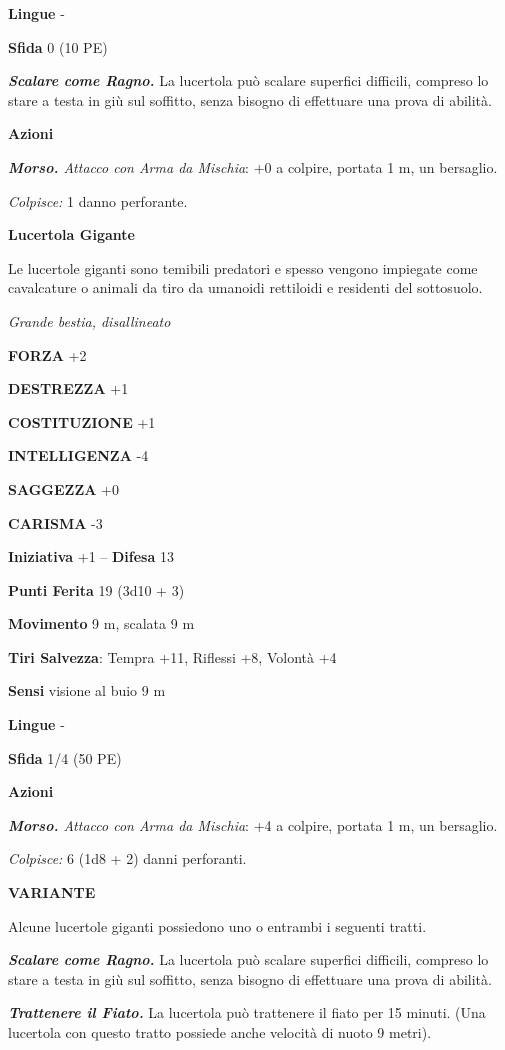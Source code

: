 \begin{multicols}{2}
\textbf{Lingue} -

\textbf{Sfida} 0 (10 PE)

\emph{\textbf{Scalare come Ragno.}} La lucertola può scalare superfici difficili, compreso lo stare a testa in giù sul soffitto, senza bisogno di effettuare una prova di abilità.

\textbf{Azioni}

\emph{\textbf{Morso.} Attacco con Arma da Mischia}: +0 a colpire, portata 1 m, un bersaglio.

\emph{Colpisce:} 1 danno perforante.

\medskip\textbf{Lucertola Gigante}

Le lucertole giganti sono temibili predatori e spesso vengono impiegate come cavalcature o animali da tiro da umanoidi rettiloidi e residenti del sottosuolo.

\emph{Grande bestia, disallineato}

\textbf{FORZA} +2

\textbf{DESTREZZA} +1

\textbf{COSTITUZIONE} +1

\textbf{INTELLIGENZA} -4

\textbf{SAGGEZZA} +0

\textbf{CARISMA} -3

\textbf{Iniziativa} +1 -- \textbf{Difesa} 13

\textbf{Punti Ferita} 19 (3d10 + 3)

\textbf{Movimento} 9 m, scalata 9 m

\textbf{Tiri Salvezza}: Tempra +11, Riflessi +8, Volontà +4 

\textbf{Sensi} visione al buio 9 m

\textbf{Lingue} -

\textbf{Sfida} 1/4 (50 PE)

\textbf{Azioni}

\emph{\textbf{Morso.} Attacco con Arma da Mischia}: +4 a colpire, portata 1 m, un bersaglio.

\emph{Colpisce:} 6 (1d8 + 2) danni perforanti.

\textbf{VARIANTE}

Alcune lucertole giganti possiedono uno o entrambi i seguenti tratti.

\emph{\textbf{Scalare come Ragno.}} La lucertola può scalare superfici difficili, compreso lo stare a testa in giù sul soffitto, senza bisogno di effettuare una prova di abilità. 

\emph{\textbf{Trattenere il Fiato.}} La lucertola può trattenere il fiato per 15 minuti. (Una lucertola con questo tratto possiede anche velocità di nuoto 9 metri).


\end{multicols}

